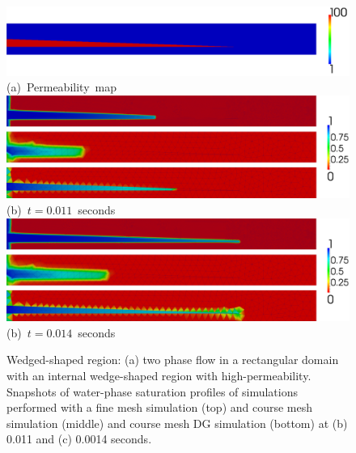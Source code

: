 \begin{figure}[h]
\vbox{
\hbox{
\hspace{-0.cm}\includegraphics[width=1.05\textwidth]{wedge_permeability}}
\vspace{-1.cm}\hbox{\hspace{4cm}(a) Permeability map}
\vspace{.5cm}
\hbox{
\hspace{-0.cm}\includegraphics[width=1.05\textwidth]{wedge_0011}}
\vspace{-0.cm}\hbox{\hspace{4cm}(b) $t= 0.011$ seconds }
\vspace{.5cm}
\hbox{
\hspace{-.cm}\includegraphics[width=1.05\textwidth]{wedge_0014}}
\vspace{-0.cm}\hbox{\hspace{4cm}(b) $t= 0.014$ seconds }
}
\caption{Wedged-shaped region: (a) two phase flow in a rectangular domain with an internal wedge-shaped region with high-permeability. Snapshots of water-phase saturation profiles of simulations performed with a fine mesh  simulation (top) 
and course mesh  simulation (middle)  and course mesh DG simulation (bottom) at (b) 0.011 and (c) 0.0014 seconds.\label{fig:wedge_permeability}}
\end{figure}



